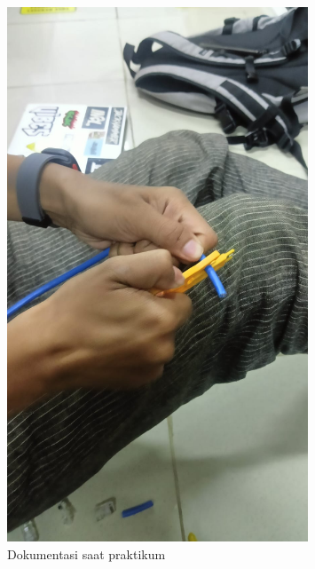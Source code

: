 \begin{figure}
    \centering
    \includegraphics[width=0.8\textwidth]{P1/img/jk1 (2).jpg}
    \caption{Dokumentasi saat praktikum}
    \label{fig:dokumentasi_praktikum_2}
\end{figure}

